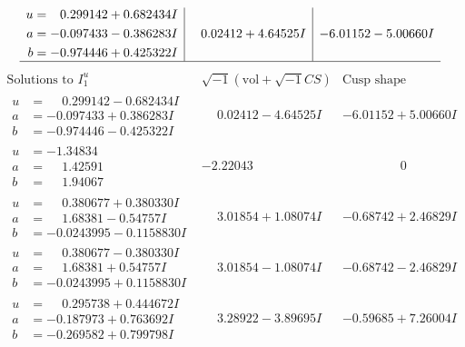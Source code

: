 \documentclass[1p]{elsarticle_modified}
\theoremstyle{definition}
\newcommand{\I}{\sqrt{-1}}
\begin{document}
$$\begin{array}{c|c|c}
\begin{aligned}
u &= \phantom{-}0.299142 + 0.682434 I \\
a &= -0.097433 - 0.386283 I \\
b &= -0.974446 + 0.425322 I\end{aligned}
 & \phantom{-}0.02412 + 4.64525 I & -6.01152 - 5.00660 I\\
 \hline 
 \end{array}$$\newpage$$\begin{array}{c|c|c}  
\text{Solutions to }I^u_{1}& \I (\text{vol} + \sqrt{-1}CS) & \text{Cusp shape}\\
 \hline 
\begin{aligned}
u &= \phantom{-}0.299142 - 0.682434 I \\
a &= -0.097433 + 0.386283 I \\
b &= -0.974446 - 0.425322 I\end{aligned}
 & \phantom{-}0.02412 - 4.64525 I & -6.01152 + 5.00660 I \\ \hline\begin{aligned}
u &= -1.34834\phantom{ +0.000000I} \\
a &= \phantom{-}1.42591\phantom{ +0.000000I} \\
b &= \phantom{-}1.94067\phantom{ +0.000000I}\end{aligned}
 & -2.22043\phantom{ +0.000000I} & \phantom{-0.000000 } 0 \\ \hline\begin{aligned}
u &= \phantom{-}0.380677 + 0.380330 I \\
a &= \phantom{-}1.68381 - 0.54757 I \\
b &= -0.0243995 - 0.1158830 I\end{aligned}
 & \phantom{-}3.01854 + 1.08074 I & -0.68742 + 2.46829 I \\ \hline\begin{aligned}
u &= \phantom{-}0.380677 - 0.380330 I \\
a &= \phantom{-}1.68381 + 0.54757 I \\
b &= -0.0243995 + 0.1158830 I\end{aligned}
 & \phantom{-}3.01854 - 1.08074 I & -0.68742 - 2.46829 I \\ \hline\begin{aligned}
u &= \phantom{-}0.295738 + 0.444672 I \\
a &= -0.187973 + 0.763692 I \\
b &= -0.269582 + 0.799798 I\end{aligned}
 & \phantom{-}3.28922 - 3.89695 I & -0.59685 + 7.26004 I \\ \hline\begin{aligned}

\end{aligned}
\end{array}$$
\end{document}
